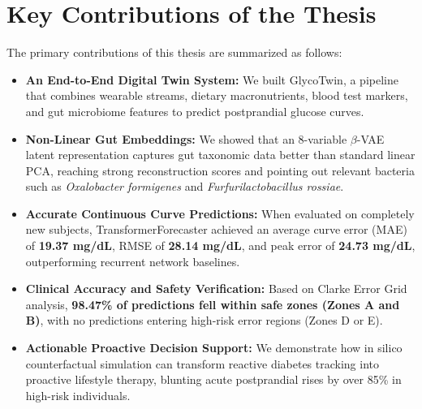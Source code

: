 \section{Key Contributions of the Thesis}
The primary contributions of this thesis are summarized as follows:
\begin{itemize}
    \item \textbf{An End-to-End Digital Twin System:} We built GlycoTwin, a pipeline that combines wearable streams, dietary macronutrients, blood test markers, and gut microbiome features to predict postprandial glucose curves.
    \item \textbf{Non-Linear Gut Embeddings:} We showed that an 8-variable $\beta$-VAE latent representation captures gut taxonomic data better than standard linear PCA, reaching strong reconstruction scores and pointing out relevant bacteria such as \emph{Oxalobacter formigenes} and \emph{Furfurilactobacillus rossiae}.
    \item \textbf{Accurate Continuous Curve Predictions:} When evaluated on completely new subjects, TransformerForecaster achieved an average curve error (MAE) of \textbf{19.37 mg/dL}, RMSE of \textbf{28.14 mg/dL}, and peak error of \textbf{24.73 mg/dL}, outperforming recurrent network baselines.
    \item \textbf{Clinical Accuracy and Safety Verification:} Based on Clarke Error Grid analysis, \textbf{98.47\% of predictions fell within safe zones (Zones A and B)}, with no predictions entering high-risk error regions (Zones D or E).
    \item \textbf{Actionable Proactive Decision Support:} We demonstrate how in silico counterfactual simulation can transform reactive diabetes tracking into proactive lifestyle therapy, blunting acute postprandial rises by over 85\% in high-risk individuals.
\end{itemize}

